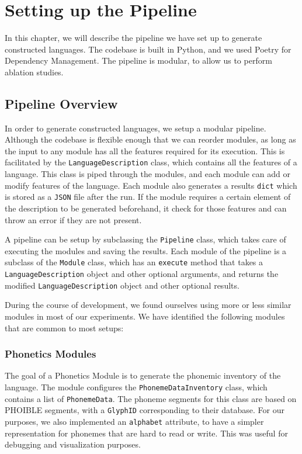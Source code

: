 \chapter{Setting up the Pipeline}\label{chapter:pipeline}

In this chapter, we will describe the pipeline we have set up to generate constructed languages. The codebase is built in Python, and we used Poetry
for Dependency Management. The pipeline is modular, to allow us to perform ablation studies.

\section{Pipeline Overview}
In order to generate constructed languages, we setup a modular pipeline. Although the codebase is flexible enough that we can reorder modules, as
long as the input to any module has all the features required for its execution. This is facilitated by the \texttt{LanguageDescription} class, which contains
all the features of a language. This class is piped through the modules, and each module can add or modify features of the language. Each module also generates a 
results \texttt{dict} which is stored as a \texttt{JSON} file after the run. If the module requires a certain element of the description to be 
generated beforehand, it check for those features and can throw an error if they are not present.

A pipeline can be setup by subclassing the \texttt{Pipeline} class, which takes care of executing the modules and saving the results. Each module of the pipeline 
is a subclass of the \texttt{Module} class, which has an \texttt{execute} method that takes a \texttt{LanguageDescription} object and other optional arguments,
and returns the modified \texttt{LanguageDescription} object and other optional results.

During the course of development, we found ourselves using more or less similar modules in most of our experiments. We have identified the following modules that are common to most
setups:

\subsection{Phonetics Modules}

The goal of a Phonetics Module is to generate the phonemic inventory of the language. The module configures the \texttt{PhonemeDataInventory} class, which
contains a list of \texttt{PhonemeData}. The phoneme segments for this class are based on PHOIBLE \cite{phoible} segments, with a \texttt{GlyphID} corresponding
to their database. For our purposes, we also implemented an \texttt{alphabet} attribute, to have a simpler representation for phonemes that are
hard to read or write. This was useful for debugging and visualization purposes.

